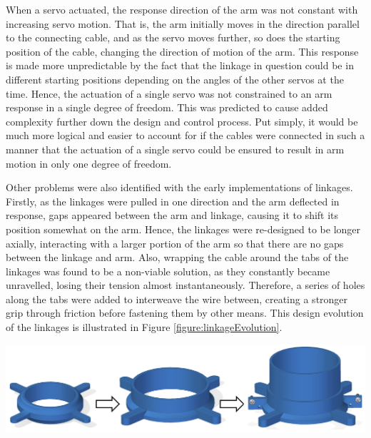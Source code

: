 \documentclass[11pt]{article}
\begin{document}
When a servo actuated, the response direction of the arm was not constant with increasing servo motion. That is, the arm initially moves in the direction parallel to the connecting cable, and as the servo moves further, so does the starting position of the cable, changing the direction of motion of the arm. This response is made more unpredictable by the fact that the linkage in question could be in different starting positions depending on the angles of the other servos at the time. Hence, the actuation of a single servo was not constrained to an arm response in a single degree of freedom. This was predicted to cause added complexity further down the design and control process. Put simply, it would be much more logical and easier to account for if the cables were connected in such a manner that the actuation of a single servo could be ensured to result in arm motion in only one degree of freedom.

Other problems were also identified with the early implementations of linkages. Firstly, as the linkages were pulled in one direction and the arm deflected in response, gaps appeared between the arm and linkage, causing it to shift its position somewhat on the arm. Hence, the linkages were re-designed to be longer axially, interacting with a larger portion of the arm so that there are no gaps between the linkage and arm. Also, wrapping the cable around the tabs of the linkages was found to be a non-viable solution, as they constantly became unravelled, losing their tension almost instantaneously. Therefore, a series of holes along the tabs were added to interweave the wire between, creating a stronger grip through friction before fastening them by other means. This design evolution of the linkages is illustrated in Figure \ref{figure:linkageEvolution}.

\begin{center}
\includegraphics[width=\textwidth]{images/linkageEvolution.png}
\label{figure:linkageEvolution}
\end{center}
\end{document}
